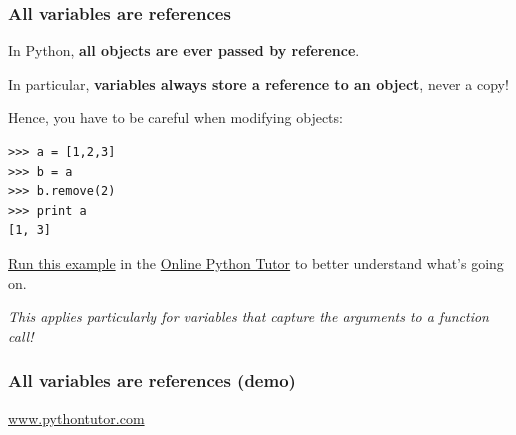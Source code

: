 \documentclass[english,serif,mathserif,xcolor=pdftex,dvipsnames,table]{beamer}
\begin{document}
\begin{frame}[fragile]
  \frametitle{All variables are references}

  In Python, \textbf{all objects are ever passed by reference}.

  \+
  In particular, \textbf{variables always store a reference to an
    object}, never a copy!

  \+
  Hence, you have to be careful when modifying objects:
\begin{lstlisting}
>>> a = [1,2,3]
>>> b = a
>>> b.remove(2)
>>> print a
[1, 3]
\end{lstlisting}

   \+
   \href{http://tinyurl.com/cq3tcab}{Run this example} in the
   \href{http://pythontutor.com/}{Online Python Tutor} to better
   understand what's going on.

   \+
   {\small \em
     This applies particularly for variables that capture the arguments
     to a function call!}

\end{frame}


\begin{frame}[fragile]
  \frametitle{All variables are references (demo)}

  \href{http://www.pythontutor.com/}{www.pythontutor.com}
  \+


\end{frame}
\end{document}
